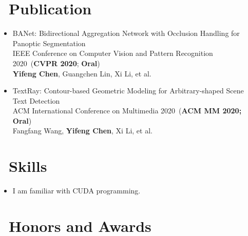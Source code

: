 \documentclass{resume}
\begin{document}
\section{\faFileTextO\ Publication}
	\begin{itemize}
	\item BANet: Bidirectional Aggregation Network with Occlusion Handling for Panoptic Segmentation \\
	IEEE Conference on Computer Vision and Pattern Recognition 2020~(\textbf{CVPR 2020}; \textbf{Oral}) \\
	\textbf{Yifeng Chen}, Guangchen Lin, Xi Li, et al. 
	\item TextRay: Contour-based Geometric Modeling for Arbitrary-shaped Scene Text Detection \\
	ACM International Conference on Multimedia 2020~(\textbf{ACM MM 2020; \textbf{Oral}})\\
	Fangfang Wang, \textbf{Yifeng Chen}, Xi Li, et al. 
\end{itemize}
\vspace{-0.5em}	

\section{\faCogs\ Skills}
\begin{itemize}[parsep=0.5ex]
  \item I am familiar with CUDA programming.
\end{itemize}
\vspace{-0.5em}
%
\section{\faHeartO\ Honors and Awards}


%
%
\end{document}
